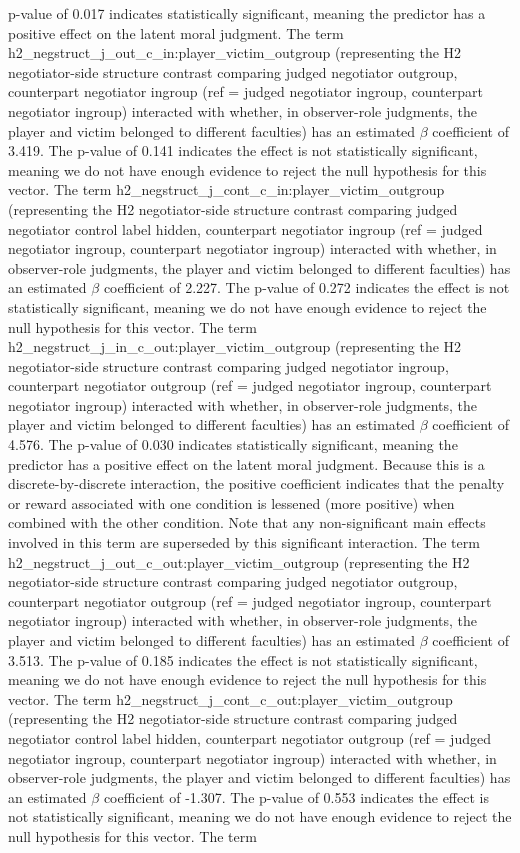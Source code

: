 \documentclass[11pt]{article}
\begin{document}
p-value of 0.017 indicates statistically significant, meaning the predictor has a positive effect on the latent moral judgment. The term h2\_negstruct\_j\_out\_c\_in:player\_victim\_outgroup (representing the H2 negotiator-side structure contrast comparing judged negotiator outgroup, counterpart negotiator ingroup (ref = judged negotiator ingroup, counterpart negotiator ingroup) interacted with whether, in observer-role judgments, the player and victim belonged to different faculties) has an estimated $\beta$ coefficient of 3.419. The p-value of 0.141 indicates the effect is not statistically significant, meaning we do not have enough evidence to reject the null hypothesis for this vector. The term h2\_negstruct\_j\_cont\_c\_in:player\_victim\_outgroup (representing the H2 negotiator-side structure contrast comparing judged negotiator control label hidden, counterpart negotiator ingroup (ref = judged negotiator ingroup, counterpart negotiator ingroup) interacted with whether, in observer-role judgments, the player and victim belonged to different faculties) has an estimated $\beta$ coefficient of 2.227. The p-value of 0.272 indicates the effect is not statistically significant, meaning we do not have enough evidence to reject the null hypothesis for this vector. The term h2\_negstruct\_j\_in\_c\_out:player\_victim\_outgroup (representing the H2 negotiator-side structure contrast comparing judged negotiator ingroup, counterpart negotiator outgroup (ref = judged negotiator ingroup, counterpart negotiator ingroup) interacted with whether, in observer-role judgments, the player and victim belonged to different faculties) has an estimated $\beta$ coefficient of 4.576. The p-value of 0.030 indicates statistically significant, meaning the predictor has a positive effect on the latent moral judgment. Because this is a discrete-by-discrete interaction, the positive coefficient indicates that the penalty or reward associated with one condition is lessened (more positive) when combined with the other condition. Note that any non-significant main effects involved in this term are superseded by this significant interaction. The term h2\_negstruct\_j\_out\_c\_out:player\_victim\_outgroup (representing the H2 negotiator-side structure contrast comparing judged negotiator outgroup, counterpart negotiator outgroup (ref = judged negotiator ingroup, counterpart negotiator ingroup) interacted with whether, in observer-role judgments, the player and victim belonged to different faculties) has an estimated $\beta$ coefficient of 3.513. The p-value of 0.185 indicates the effect is not statistically significant, meaning we do not have enough evidence to reject the null hypothesis for this vector. The term h2\_negstruct\_j\_cont\_c\_out:player\_victim\_outgroup (representing the H2 negotiator-side structure contrast comparing judged negotiator control label hidden, counterpart negotiator outgroup (ref = judged negotiator ingroup, counterpart negotiator ingroup) interacted with whether, in observer-role judgments, the player and victim belonged to different faculties) has an estimated $\beta$ coefficient of -1.307. The p-value of 0.553 indicates the effect is not statistically significant, meaning we do not have enough evidence to reject the null hypothesis for this vector. The term 
\end{document}
